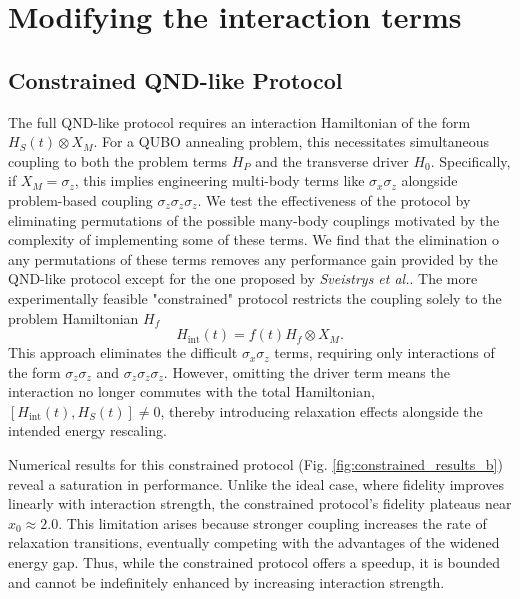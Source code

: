 \chapter{Modifying the interaction terms}\label{Ch5:ModifyingInteraction}

\section{Constrained QND-like Protocol}

\qquad The full QND-like protocol requires an interaction Hamiltonian of the form $H_S(t) \otimes X_M$. For a QUBO annealing problem, this necessitates simultaneous coupling to both the problem terms $H_P$ and the transverse driver $H_0$. Specifically, if $X_M = \sigma_z$, this implies engineering multi-body terms like $\sigma_x \sigma_z$ alongside problem-based coupling $\sigma_z \sigma_z \sigma_z$. We test the effectiveness of the protocol by eliminating permutations of the possible many-body couplings motivated by the complexity of implementing some of these terms. We find that the elimination o any permutations of these terms removes any performance gain provided by the QND-like protocol except for the one proposed by \textit{Sveistrys et al.}. The more experimentally feasible "constrained" protocol restricts the coupling solely to the problem Hamiltonian $H_f$
\begin{equation}
    H_{\text{int}}(t) = f(t) H_f \otimes X_M.
\end{equation}
\qquad This approach eliminates the difficult $\sigma_x \sigma_z$ terms, requiring only interactions of the form $\sigma_z \sigma_z$ and $\sigma_z \sigma_z \sigma_z$. However, omitting the driver term means the interaction no longer commutes with the total Hamiltonian, $[H_{\text{int}}(t), H_S(t)] \neq 0$, thereby introducing relaxation effects alongside the intended energy rescaling.

\qquad Numerical results for this constrained protocol (Fig. \ref{fig:constrained_results_b}) reveal a saturation in performance. Unlike the ideal case, where fidelity improves linearly with interaction strength, the constrained protocol's fidelity plateaus near $x_0 \approx 2.0$. This limitation arises because stronger coupling increases the rate of relaxation transitions, eventually competing with the advantages of the widened energy gap. Thus, while the constrained protocol offers a speedup, it is bounded and cannot be indefinitely enhanced by increasing interaction strength.

